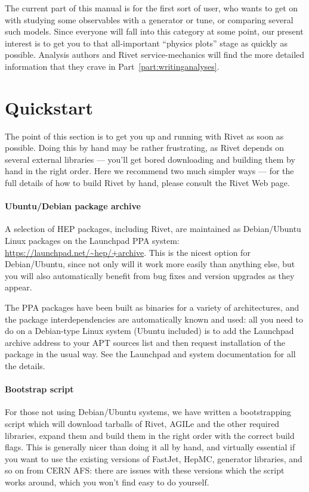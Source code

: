 \documentclass{JHEP3}
\begin{document}
The current part of this manual is for the first sort of user, who wants to get
on with studying some observables with a generator or tune, or comparing several
such models. Since everyone will fall into this category at some point, our
present interest is to get you to that all-important ``physics plots'' stage as
quickly as possible. Analysis authors and Rivet service-mechanics will find the
more detailed information that they crave in Part~\ref{part:writinganalyses}.


\section{Quickstart}

The point of this section is to get you up and running with Rivet as soon as
possible. Doing this by hand may be rather frustrating, as Rivet depends on
several external libraries --- you'll get bored downloading and building them by
hand in the right order. Here we recommend two much simpler ways --- for the
full details of how to build Rivet by hand, please consult the Rivet Web page.


\paragraph{Ubuntu/Debian package archive}

A selection of HEP packages, including Rivet, are maintained as Debian/Ubuntu
Linux packages on the Launchpad PPA system:
\url{https://launchpad.net/~hep/+archive}. This is the nicest option for
Debian/Ubuntu, since not only will it work more easily than anything else, but
you will also automatically benefit from bug fixes and version upgrades as they
appear.

The PPA packages have been built as binaries for a variety of architectures, and
the package interdependencies are automatically known and used: all you need to
do on a Debian-type Linux system (Ubuntu included) is to add the Launchpad
archive address to your APT sources list and then request installation of the
 package in the usual way. See the Launchpad and system documentation
for all the details.


\paragraph{Bootstrap script}

For those not using Debian/Ubuntu systems, we have written a bootstrapping
script which will download tarballs of Rivet, AGILe and the other required
libraries, expand them and build them in the right order with the correct build
flags. This is generally nicer than doing it all by hand, and virtually
essential if you want to use the existing versions of FastJet, HepMC, generator
libraries, and so on from CERN AFS: there are issues with these versions which
the script works around, which you won't find easy to do yourself.
\end{document}
